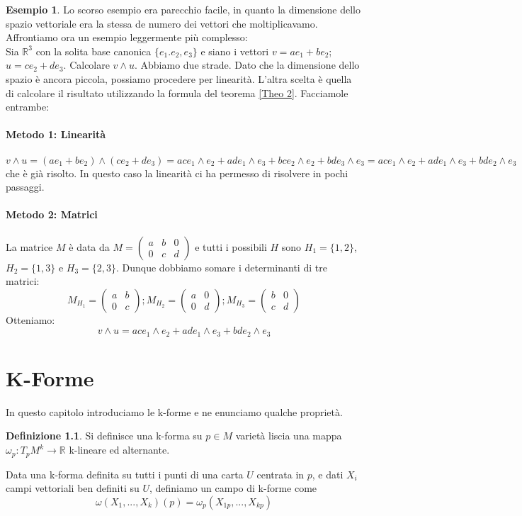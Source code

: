 \documentclass[12pt,a4paper]{report}
\theoremstyle{definition}
\newtheorem{Def}{Definizione}[chapter]
\theoremstyle{Theorem}
\theoremstyle{definition}
\newtheorem{Ex}[Def]{Esempio}
\theoremstyle{definition}
\theoremstyle{definition}
\begin{document}
\begin{Ex}
	Lo scorso esempio era parecchio facile, in quanto la dimensione dello spazio vettoriale era la stessa de numero dei vettori che moltiplicavamo. Affrontiamo ora un esempio leggermente più complesso:\\
	Sia $\mathbb{R}^3$ con la solita base canonica $\{e_1.e_2,e_3\}$ e siano i vettori $v=ae_1+be_2$; $u=ce_2+de_3$. Calcolare $v\wedge u$. Abbiamo due strade. Dato che la dimensione dello spazio è ancora piccola, possiamo procedere per linearità. L'altra scelta è quella di calcolare il risultato utilizzando la formula del teorema \ref{Theo 2}. Facciamole entrambe:\\\\
	\textbf{Metodo 1: Linearità}\\
	\\
	$v\wedge u=(ae_1+be_2)\wedge(ce_2+de_3)=ace_1\wedge e_2+ade_1\wedge e_3+bce_2\wedge e_2+bde_3\wedge e_3=ace_1\wedge e_2+ade_1\wedge e_3+bde_2\wedge e_3$ che è già risolto. In questo caso la linearità ci ha permesso di risolvere in pochi passaggi.\\
	\\
	\textbf{Metodo 2: Matrici}\\
	\\
	La matrice $M$ è data da $M=\begin{pmatrix}
		a&b&0\\0&c&d
\end{pmatrix}$ e tutti i possibili $H$ sono $H_1=\{1,2\}$,$H_2=\{1,3\}$ e $H_3=\{2,3\}$. Dunque dobbiamo somare i determinanti di tre matrici:\\
$$M_{H_1}=\begin{pmatrix}
	a&b\\0&c
\end{pmatrix};
M_{H_2}=\begin{pmatrix}
a&0\\0&d
\end{pmatrix};
M_{H_3}=\begin{pmatrix}
	b&0\\c&d
\end{pmatrix}$$ 
Otteniamo:
$$v\wedge u=ace_1\wedge e_2+ade_1\wedge e_3+bde_2\wedge e_3$$
\end{Ex}
\chapter{K-Forme}
In questo capitolo introduciamo le k-forme e ne enunciamo qualche proprietà.
\begin{Def}
	Si definisce una k-forma su $p\in M$ varietà liscia una mappa $\omega_p:T_pM^k\rightarrow \mathbb{R}$ k-lineare ed alternante.
\end{Def}
Data una k-forma definita su tutti i punti di una carta $U$ centrata in $p$, e dati $X_i$ campi vettoriali ben definiti su $U$, definiamo un campo di k-forme come
$$\omega(X_1,...,X_k)(p)=\omega_p(X_{1p},...,X_{kp})$$
\end{document}
